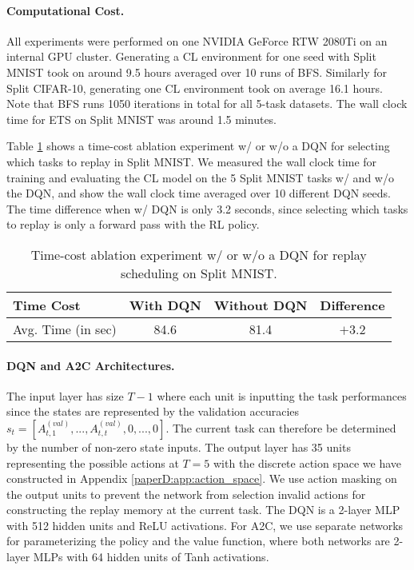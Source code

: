 \vspace{-3mm}
\paragraph{Computational Cost.} 
All experiments were performed on one NVIDIA GeForce RTW 2080Ti on an internal GPU cluster. Generating a CL environment for one seed with Split MNIST took on around 9.5 hours averaged over 10 runs of BFS. Similarly for Split CIFAR-10, generating one CL environment took on average 16.1 hours. Note that BFS runs 1050 iterations in total for all 5-task datasets. The wall clock time for ETS on Split MNIST was around 1.5 minutes. 

Table \ref{tab:time_cost_dqn_mnist} shows a time-cost ablation experiment w/ or w/o a DQN for selecting which tasks to replay in Split MNIST. We measured the wall clock time for training and evaluating the CL model on the 5 Split MNIST tasks w/ and w/o the DQN, and show the wall clock time averaged over 10 different DQN seeds. The time difference when w/ DQN is only 3.2 seconds, since selecting which tasks to replay is only a forward pass with the RL policy.

\begin{table}[h!]
	\centering
	\caption{Time-cost ablation experiment w/ or w/o a DQN for replay scheduling on Split MNIST. }
	\vspace{-3mm}
	\begin{tabular}{lccc}
		\toprule
		Time Cost          & With DQN & Without DQN & Difference \\ \midrule
		Avg. Time (in sec) & 84.6     & 81.4        & $+$3.2   \\
		\bottomrule
	\end{tabular}
	\vspace{-1mm}
	\label{tab:time_cost_dqn_mnist}
\end{table}


\vspace{-3mm}
\paragraph{DQN and A2C Architectures.}
The input layer has size $T-1$ where each unit is inputting the task performances since the states are represented by the validation accuracies $s_t = [A_{t, 1}^{(val)}, ..., A_{t, t}^{(val)}, 0, ..., 0]$. The current task can therefore be determined by the number of non-zero state inputs. 
The output layer has 35 units representing the possible actions at $T=5$ with the discrete action space we have constructed in Appendix \ref{paperD:app:action_space}. %
We use action masking on the output units to prevent the network from selection invalid actions for constructing the replay memory at the current task. The DQN is a 2-layer MLP with 512 hidden units and ReLU activations. For A2C, we use separate networks for parameterizing the policy and the value function, where both networks are 2-layer MLPs with 64 hidden units of Tanh activations. 


